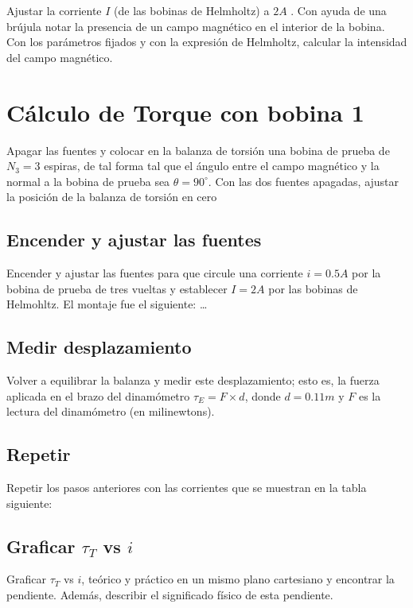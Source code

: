 Ajustar la corriente $I$ (de las bobinas de Helmholtz) a $2A$ . Con ayuda de una
brújula notar la presencia de un campo magnético en el interior de la bobina.
Con los parámetros fijados y con la expresión de Helmholtz, calcular la
intensidad del campo magnético.

\section{Cálculo de Torque con bobina 1}

Apagar las fuentes y colocar en la balanza de torsión una bobina de prueba de
$N_3 = 3$ espiras, de tal forma tal que el ángulo entre el campo magnético y la
normal a la bobina de prueba sea $\theta = 90^{\circ}$. Con las dos fuentes
apagadas, ajustar la posición de la balanza de torsión en cero

\subsection{Encender y ajustar las fuentes}

Encender y ajustar las fuentes para que circule una corriente $i = 0.5A$ por la
bobina de prueba de tres vueltas y establecer $I = 2A$ por las bobinas de
Helmohltz. El montaje fue el siguiente:
\dots

\subsection{Medir desplazamiento}

Volver a equilibrar la balanza y medir este desplazamiento; esto es, la fuerza
aplicada en el brazo del dinamómetro $\tau_{E} = F \times d$, donde $d = 0.11m$
y $F$ es la lectura del dinamómetro (en milinewtons).

\subsection{Repetir}

Repetir los pasos anteriores con las corrientes que se muestran en la
tabla siguiente:

\subsection{Graficar $\tau_{T}$ vs $i$}

Graficar $\tau_{T}$ vs $i$, teórico y práctico en un mismo plano cartesiano y
encontrar la pendiente. Además, describir el significado físico de esta
pendiente.


